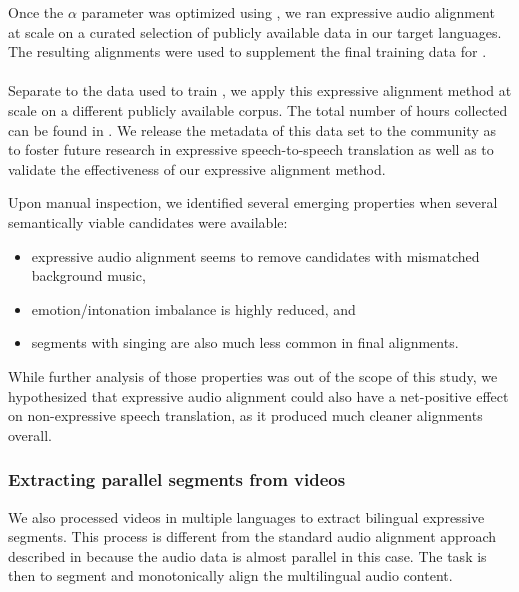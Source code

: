 \noindent 
Once the $\alpha$ parameter was optimized using \xsimexp, we ran expressive \sst audio alignment at scale on a curated selection of publicly available data in our target languages. The resulting alignments were used to supplement the final training data for \seamlessexpressive.


\paragraph{\seamlessalignexpressive} Separate to the data used to train \seamlessexpressive, we apply this expressive alignment method at scale on a different publicly available corpus. The total number of hours collected can be found in . We release the metadata of this data set to the community as \seamlessalignexpressive to foster future research in expressive speech-to-speech translation as well as to validate the effectiveness of our expressive alignment method.

Upon manual inspection, we identified several emerging properties when several semantically viable candidates were available: 
\begin{itemize}
    \item expressive audio alignment seems to remove candidates with mismatched background music,
    \item emotion/intonation imbalance is highly reduced, and
    \item segments with singing are also much less common in final alignments.
\end{itemize}
While further analysis of those properties was out of the scope of this study, we hypothesized that expressive audio alignment could also have a net-positive effect on non-expressive speech translation, as it produced much cleaner alignments overall.



\subsubsection{Extracting parallel segments from videos}
\label{sec:dubbed_data}
We also processed videos in multiple languages to extract bilingual expressive segments.
This process is different from the standard audio alignment approach described in  because the audio data is almost parallel in this case.
The task is then to segment and monotonically align the multilingual audio content.

